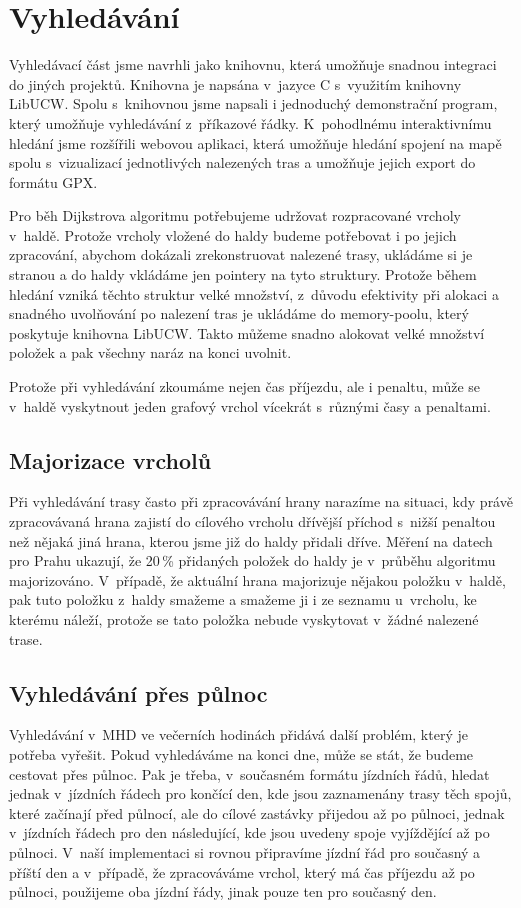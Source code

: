 \section{Vyhledávání}
\label{ch:implementace:vyhledavani}
Vyhledávací část jsme navrhli jako knihovnu, která umožňuje snadnou integraci do
jiných projektů. Knihovna je napsána v~jazyce C s~využitím knihovny LibUCW.
Spolu s~knihovnou jsme napsali i jednoduchý demonstrační program, který umožňuje
vyhledávání z~příkazové řádky. K~pohodlnému interaktivnímu hledání jsme
rozšířili webovou aplikaci, která umožňuje hledání spojení na mapě spolu
s~vizualizací jednotlivých nalezených tras a umožňuje jejich export do formátu
GPX.

Pro běh Dijkstrova algoritmu potřebujeme udržovat rozpracované vrcholy v~haldě.
Protože vrcholy vložené do haldy budeme potřebovat i po jejich zpracování,
abychom dokázali zrekonstruovat nalezené trasy, ukládáme si je stranou a do
haldy vkládáme jen pointery na tyto struktury. Protože během hledání vzniká
těchto struktur velké množství, z~důvodu efektivity při alokaci a snadného
uvolňování po nalezení tras je ukládáme do memory-poolu, který poskytuje
knihovna LibUCW. Takto můžeme snadno alokovat velké množství položek a pak
všechny naráz na konci uvolnit.

Protože při vyhledávání zkoumáme nejen čas příjezdu, ale i penaltu, může se
v~haldě vyskytnout jeden grafový vrchol vícekrát s~různými časy a penaltami.

\subsection{Majorizace vrcholů}
Při vyhledávání trasy často při zpracovávání hrany narazíme na situaci, kdy
právě zpracovávaná hrana zajistí do cílového vrcholu dřívější příchod s~nižší
penaltou než nějaká jiná hrana, kterou jsme již do haldy přidali dříve. Měření
na datech pro Prahu ukazují, že 20\,\% přidaných položek do haldy je v~průběhu
algoritmu majorizováno. V~případě, že aktuální hrana majorizuje nějakou položku
v~haldě, pak tuto položku z~haldy smažeme a smažeme ji i ze seznamu u~vrcholu,
ke kterému náleží, protože se tato položka nebude vyskytovat v~žádné nalezené
trase.

\subsection{Vyhledávání přes půlnoc}
Vyhledávání v~MHD ve večerních hodinách přidává další problém, který je potřeba
vyřešit. Pokud vyhledáváme na konci dne, může se stát, že budeme cestovat přes
půlnoc. Pak je třeba, v~současném formátu jízdních řádů, hledat jednak
v~jízdních řádech pro končící den, kde jsou zaznamenány trasy těch spojů, které
začínají před půlnocí, ale do cílové zastávky přijedou až po půlnoci, jednak
v~jízdních řádech pro den následující, kde jsou uvedeny spoje vyjíždějící až po
půlnoci. V~naší implementaci si rovnou připravíme jízdní řád pro současný a
příští den a v~případě, že zpracováváme vrchol, který má čas příjezdu až po
půlnoci, použijeme oba jízdní řády, jinak pouze ten pro současný den.

